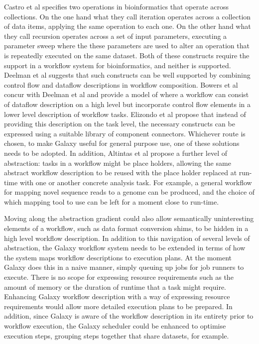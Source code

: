 \documentclass[a4paper,10pt]{scrreprt}
\begin{document}
Castro et al \cite{castro_workflows_2005} specifies two operations in bioinformatics that operate across collections. On the one hand what they call iteration operates across a collection of data items, applying the same operation to each one. On the other hand what they call recursion operates across a set of input parameters, executing a parameter sweep where the these parameters are used to alter an operation that is repeatedly executed on the same dataset. Both of these constructs require the support in a workflow system for bioinformatics, and neither is supported. Deelman et al \cite{deelman_workflows_2009} suggests that such constructs can be well supported by combining control flow and dataflow descriptions in workflow composition. Bowers et al \cite{bowers_enabling_2006} concur with Deelman et al and provide a model of where a workflow can consist of dataflow description on a high level but incorporate control flow elements in a lower level description of workflow tasks. 
Elizondo et al \cite{velasco_elizondo_catalogue_2010} propose that instead of providing this description on the task level, the necessary constructs can be expressed using a suitable library of component connectors. Whichever route is chosen, to make Galaxy useful for general purpose use, one of these solutions needs to be adopted. In addition, Altintas et al \cite{altintas_framework_2005} propose a further level of abstraction: tasks in a workflow might be place holders, allowing the same abstract workflow description to be reused with the place holder replaced at run-time with one or another concrete analysis task. For example, a general workflow for mapping novel sequence reads to a genome can be produced, and the choice of which mapping tool to use can be left for a moment close to run-time.

Moving along the abstraction gradient could also allow semantically uninteresting elements of a workflow, such as data format conversion shims, to be hidden in a high level workflow description. In addition to this navigation of several levels of abstraction, the Galaxy workflow system needs to be extended in terms of how the system maps workflow descriptions to execution plans. At the moment Galaxy does this in a naive manner, simply queuing up jobs for job runners to execute. There is no scope for expressing resource requirements such as the amount of memory or the duration of runtime that a task might require. Enhancing Galaxy workflow description with a way of expressing resource requirements would allow more detailed execution plans to be prepared. In addition, since Galaxy is aware of the workflow description in its entirety prior to workflow execution, the Galaxy scheduler could be enhanced to optimise execution steps, grouping steps together that share datasets, for example.
\end{document}
